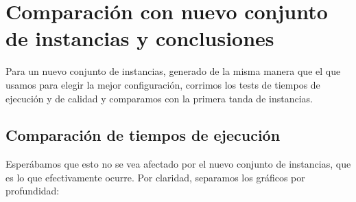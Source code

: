 \section{Comparación con nuevo conjunto de instancias y conclusiones}

Para un nuevo conjunto de instancias, generado de la misma manera que el que usamos para elegir la mejor configuración, corrimos los tests de tiempos de ejecución y de calidad y comparamos con la primera tanda de instancias.

\subsection{Comparación de tiempos de ejecución}

Esperábamos que esto no se vea afectado por el nuevo conjunto de instancias, que es lo que efectivamente ocurre. Por claridad, separamos los gráficos por profundidad:

\begin{figure}[H]
    \begin{minipage}[t]{\linewidth}
		\centering
		\label{fig:ejercicio-6-tiempos-grasp-2-2}
    \end{minipage}
\end{figure}

